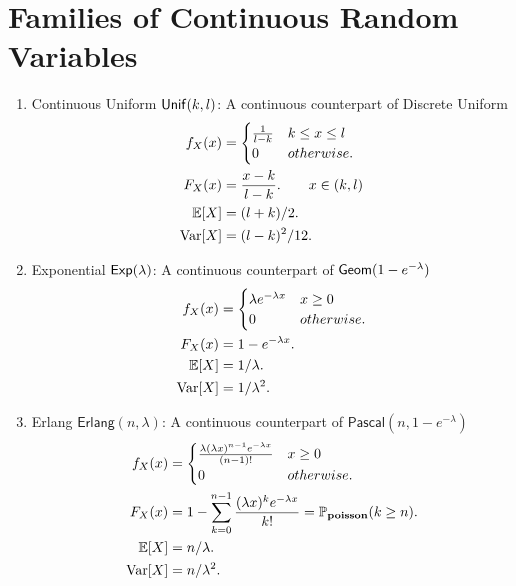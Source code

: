 \section{Families of Continuous Random Variables}
\begin{enumerate}
    \item Continuous Uniform $\mathsf{Unif}(k,l)$: A continuous counterpart of Discrete Uniform {
        \begin{align*}
            f_X(x)
            &= {
                \begin{cases}
                \frac{1}{l-k} & k\leq x \leq l \\
                0             & otherwise.
                \end{cases} } \\
            F_X(x)
            &= \frac{x-k}{l-k}. \qquad x\in (k,l)\\
            \E{X}
            &= (l+k)/2. \\
            \Var[X]
            &= (l-k)^2/12. \\
        \end{align*}
    }
    \item Exponential $\mathsf{Exp}(\lambda)$: A continuous counterpart of $\mathsf{Geom}(1-e^{-\lambda})$ {
        \begin{align*}
            f_X(x)
            &= {
                \begin{cases}
                    \lambda e^{-\lambda x} & x\geq 0 \\
                    0                      & otherwise.
                \end{cases}
            } \\
            F_X(x)
            &= 1-e^{-\lambda x}. \\
            \E{X}
            &= 1/\lambda. \\
            \Var[X]
            &= 1/\lambda^2.
        \end{align*}
    }
    \item Erlang $\mathsf{Erlang}(n,\lambda)$: A continuous counterpart of  $\mathsf{Pascal}(n,1-e^{-\lambda})${
        \begin{align*}
            f_X(x)
            &= {
                \begin{cases}
                    \frac{\lambda (\lambda x)^{n-1}e^{-\lambda x}}{(n-1)!} & x\geq 0 \\
                    0      & otherwise.
                \end{cases}
            } \\
            F_X(x)
            &= 1-\sum_{k=0}^{n-1}\frac{(\lambda x)^k e^{-\lambda x}}{k!} = \mathbb{P}_{\mathbf{poisson}}(k\geq n). \\
            \E{X}
            &= n/\lambda. \\
            \Var[X]
            &= n/\lambda^2.
        \end{align*}
    }
\end{enumerate}


